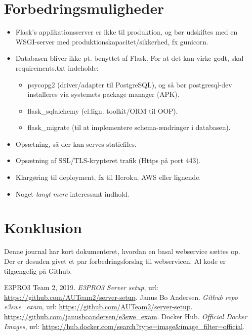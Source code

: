 \documentclass[a4paper]{article}
\begin{document}
\section{Forbedringsmuligheder}
\begin{itemize}
	\item Flask's applikationsserver er ikke til produktion, og bør udskiftes med en WSGI-server med produktionskapacitet/sikkerhed, fx gunicorn.
	\item Databasen bliver ikke pt. benyttet af Flask. For at det kan virke godt, skal requirements.txt indeholde:
	\begin{itemize}
		\item psycopg2 (driver/adapter til PostgreSQL), og så bør postgresql-dev installeres via systemets package manager (APK).
		\item flask\_sqlalchemy (el.lign. toolkit/ORM til OOP).
		\item flask\_migrate (til at implementere schema-ændringer i databasen).
	\end{itemize}
	\item Opsætning, så der kan serves staticfiles.
	\item Opsætning af SSL/TLS-krypteret trafik (Https på port 443).
	\item Klargøring til deployment, fx til Heroku, AWS eller lignende.
	\item Noget \textit{langt mere} interessant indhold.
\end{itemize}

\section{Konklusion}
Denne journal har kort dokumenteret, hvordan en basal webservice sættes op.
Der er desuden givet et par forbedringsforslag til webservicen.
Al kode er tilgængelig på Github.

\begin{thebibliography}{9}
	 E3PRO3 Team 2, 2019. \emph{E3PRO3 Server setup},
	url: \url{https://github.com/AUTeam2/server-setup}.
	 Janus Bo Andersen. \emph{Github repo e3swe\_exam},
	url: \url{https://github.com/AUTeam2/server-setup}.
	\url{https://github.com/janusboandersen/e3swe_exam}.
	 Docker Hub. \emph{Official Docker Images},
	url: \url{https://hub.docker.com/search?type=image&image_filter=official}.
\end{thebibliography}
\end{document}
